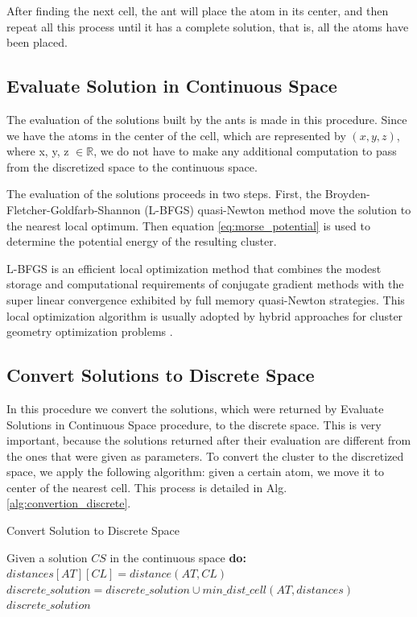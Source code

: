 			After finding the next cell, the ant will place the atom in its center, and then repeat all this process until it has a complete solution, that is, all the atoms have been placed.
			
			\subsection{Evaluate Solution in Continuous Space}
			
			The evaluation of the solutions built by the ants is made in this procedure. Since we have the atoms in the center of the cell, which are represented by $(x,y,z)$, where x, y, z $\in \mathbb{R}$, we do not have to make any additional computation to pass from the discretized space to the continuous space.
			
			The evaluation of the solutions proceeds in two steps. First, the Broyden-Fletcher-Goldfarb-Shannon (L-BFGS) quasi-Newton method \cite{liu89} move the solution to the nearest local optimum. Then equation \ref{eq:morse_potential} is used to determine the potential energy of the resulting cluster.

			L-BFGS is an efficient local optimization method that combines the modest storage and computational requirements of conjugate gradient methods with the super linear convergence exhibited by full memory quasi-Newton strategies. This local optimization algorithm is usually adopted by hybrid approaches for cluster geometry optimization problems \cite{grosso07, johnston03, xico09}.
						
			\subsection{Convert Solutions to Discrete Space}
			In this procedure we convert the solutions, which were returned by Evaluate Solutions in Continuous Space procedure, to the discrete space. This is very important, because the solutions returned after their evaluation are different from the ones that were given as parameters.
			To convert the cluster to the discretized space, we apply the following algorithm: given a certain atom, we move it to center of the nearest cell. This process is detailed in Alg. \ref{alg:convertion_discrete}.
			
			\begin{algorithm}
				\caption{Convert Solution to Discrete Space}
				\label{alg:convertion_discrete}
				\begin{algorithmic}
				\STATE Given a solution $CS$ in the continuous space \bf{do}:
								\STATE $distances[AT][CL] = distance(AT, CL)$
						\ENDFOR
						\STATE $discrete\_solution = discrete\_solution \cup min\_dist\_cell(AT, distances)$
				\ENDFOR
				\RETURN $discrete\_solution$
				\end{algorithmic}
			\end{algorithm}
			
